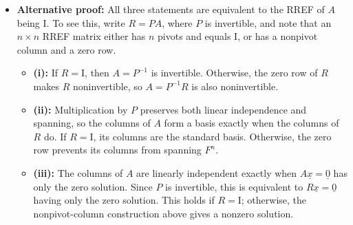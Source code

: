 \documentclass[11pt,twoside]{report}
\newcommand{\vecnot}{\underline}
\newcommand{\Id}{{\mathrm{I}}}
\newcommand{\Span}{\mathrm{span}}
\begin{document}
\begin{itemize}
\begin{itemize}
\item By (iii) $\implies$ (ii) the columns of $B$ form a basis for $F^n$, and so we can apply the same argument as above to see that there exists and $n \times n$ matrix $C$ such that $B C = \Id$

\item Finally, we have
\[
A = A (BC) = A B C  = (AB) C  = C  \quad \implies \quad \text{$A$ is invertible with $A^{-1} = B $}
\]


%
\end{itemize}

\item \textbf{Alternative proof:} All three statements are equivalent to the RREF of $A$ being $\Id$.  To see this, write $R=PA$, where $P$ is invertible, and note that an $n\times n$ RREF matrix either has $n$ pivots and equals $\Id$, or has a nonpivot column and a zero row.
\begin{itemize}
\item \textbf{(i):} If $R=\Id$, then $A=P^{-1}$ is invertible.  Otherwise, the zero row of $R$ makes $R$ noninvertible, so $A=P^{-1}R$ is also noninvertible.
\item \textbf{(ii):} Multiplication by $P$ preserves both linear independence and spanning, so the columns of $A$ form a basis exactly when the columns of $R$ do.  If $R=\Id$, its columns are the standard basis.  Otherwise, the zero row prevents its columns from spanning $F^n$.
\item \textbf{(iii):} The columns of $A$ are linearly independent exactly when $A\vecnot{x}=\vecnot{0}$ has only the zero solution.  Since $P$ is invertible, this is equivalent to $R\vecnot{x}=\vecnot{0}$ having only the zero solution.  This holds if $R=\Id$; otherwise, the nonpivot-column construction above gives a nonzero solution.
\end{itemize}


\end{itemize}
\end{document}
